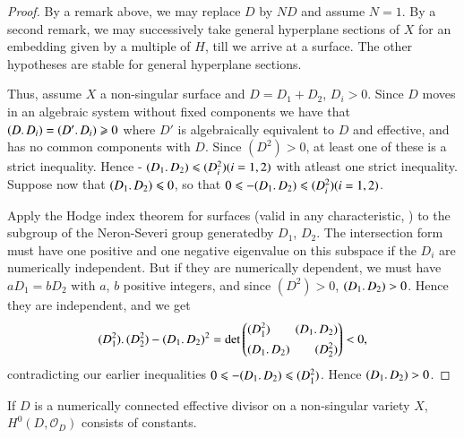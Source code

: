 \begin{proof}
By a remark above, we may replace $D$ by $ND$ and assume $N=1$. By a second remark, we may successively take general hyperplane sections of $X$ for an embedding given by a multiple of $H$, till we arrive at a surface. The other hypotheses are stable for general hyperplane sections.

Thus, assume $X$ a non-singular surface and $D = D_1 + D_2$, $D_i > 0$. Since $D$ moves in an algebraic system without fixed components we have that $(D \ldotp D_i) = (D' \ldotp D_i ) \geqslant 0$ where $D'$ is algebraically equivalent to $D$ and effective, and has no common components with $D$. Since $(D^2)>0$, at least one of these is a strict inequality. Hence - $(D_1 \ldotp D_2) \leqslant (D^2_i) (i=1,2)$ with atleast one strict inequality. Suppose now that $(D_1 \ldotp D_2) \leqslant 0$, so that $0 \leqslant - (D_1 \ldotp D_2) \leqslant (D^2_i) (i=1,2)$.

Apply the Hodge index theorem for surfaces (valid in any
characteristic, \cite{art9-key4}) to the subgroup of the Neron-Severi
group generated\pageoriginale by $D_1$, $D_2$. The intersection form
must have one positive and one negative eigenvalue on this subspace if
the $D_i$ are numerically independent. But if they are numerically
dependent, we must have $aD_1 = bD_2$ with $a$, $b$ positive integers,
and since $(D^2) >0$, $(D_1 \ldotp D_2) >0$. Hence they are
independent, and we get 
\begin{equation*}
(D^2_1) \ldotp (D^2_2) - (D_1 \ldotp D_2)^2 = \det 
\left(
\begin{aligned}
& (D^2_1)  \qquad (D_1 \ldotp D_2)\\
& (D_1 \ldotp D_2) \qquad   (D^2_2)
\end{aligned}
\right) < 0,
\end{equation*}
contradicting our earlier inequalities $0\leqslant - (D_1 \ldotp D_2) \leqslant (D^2_1)$. Hence $(D_1 \ldotp D_2) >0$.
\end{proof}

\begin{lem}\label{art9-lem3}%
If $D$ is a numerically connected effective divisor on a non-singular variety $X$, $H^0 (D, \mathscr{O}_D)$ consists of constants.
\end{lem}

